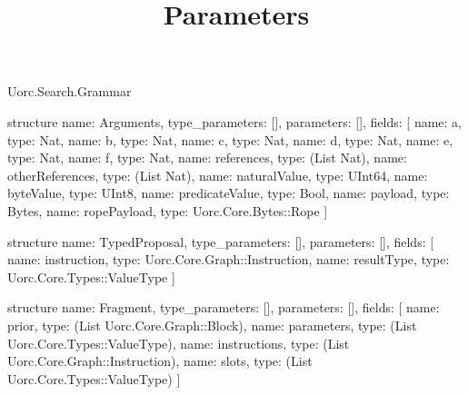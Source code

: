 \begin{lexlean}{Uorc.Search.Grammar}
\title{Parameters}
\begin{semanticmodule}
structure{
  name: Arguments,
  type_parameters: [],
  parameters: [],
  fields: [
    {name: a, type: Nat},
    {name: b, type: Nat},
    {name: c, type: Nat},
    {name: d, type: Nat},
    {name: e, type: Nat},
    {name: f, type: Nat},
    {name: references, type: (List Nat)},
    {name: otherReferences, type: (List Nat)},
    {name: naturalValue, type: UInt64},
    {name: byteValue, type: UInt8},
    {name: predicateValue, type: Bool},
    {name: payload, type: Bytes},
    {name: ropePayload, type: Uorc.Core.Bytes::Rope}
  ]
}

structure{
  name: TypedProposal,
  type_parameters: [],
  parameters: [],
  fields: [
    {name: instruction, type: Uorc.Core.Graph::Instruction},
    {name: resultType, type: Uorc.Core.Types::ValueType}
  ]
}

structure{
  name: Fragment,
  type_parameters: [],
  parameters: [],
  fields: [
    {name: prior, type: (List Uorc.Core.Graph::Block)},
    {name: parameters, type: (List Uorc.Core.Types::ValueType)},
    {name: instructions, type: (List Uorc.Core.Graph::Instruction)},
    {name: slots, type: (List Uorc.Core.Types::ValueType)}
  ]
}


\end{semanticmodule}
\end{lexlean}
